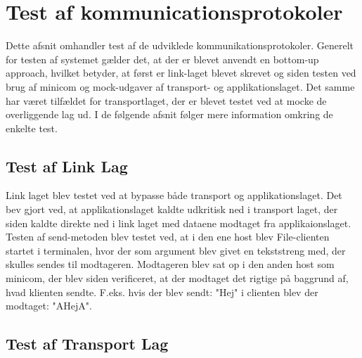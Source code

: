 \chapter{Test af kommunicationsprotokoler}\label{ch:test}
Dette afsnit omhandler test af de udviklede kommunikationsprotokoler. Generelt for testen af systemet gælder det, at der er blevet anvendt en bottom-up approach, hvilket betyder, at først er link-laget blevet skrevet og siden testen ved brug af minicom og mock-udgaver af transport- og applikationslaget. Det samme har været tilfældet for transportlaget, der er blevet testet ved at mocke de overliggende lag ud. I de følgende afsnit følger mere information omkring de enkelte test.

\section{Test af Link Lag}
Link laget blev testet ved at bypasse både transport og applikationslaget. Det bev gjort ved, at  applikationslaget kaldte udkritisk ned i transport laget, der siden kaldte direkte ned i link laget med dataene modtaget fra applikaionslaget.
Testen af send-metoden blev testet ved, at i den ene host blev File-clienten startet i terminalen, hvor der som argument blev givet en tekststreng med, der skulles sendes til modtageren. Modtageren blev sat op i den anden host som minicom, der blev siden verificeret, at der modtaget det rigtige på baggrund af, hvad klienten sendte. F.eks. hvis der blev sendt: "Hej"  i clienten blev der modtaget: "AHejA".


\section{Test af Transport Lag}